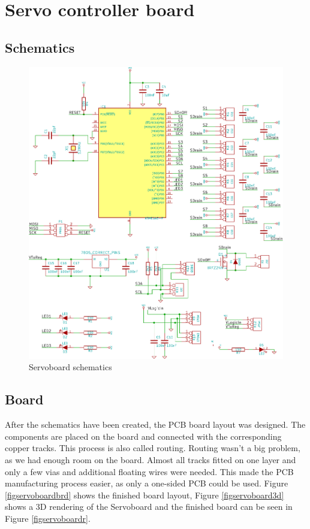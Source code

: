 \documentclass[a4paper
               ,10pt
               ,DIV=10 %
               ,BCOR=0.3cm
               ,pagesize %
               ,headings=small
               ,bibtotoc
               ]
               {scrartcl}
\begin{document}
\section{Servo controller board}

\subsection{Schematics}

\begin{figure}[H]
\begin{center}
\includegraphics[width=\linewidth]{pic/servoboard}
\caption{Servoboard schematics}
\label{figservoboardscm}
\end{center}
\end{figure}

\subsection{Board}
After the schematics have been created, the PCB board layout was designed.
The components are placed on the board and connected with the corresponding copper tracks.
This process is also called routing.
Routing wasn't a big problem, as we had enough room on the board.
Almost all tracks fitted on one layer and only a few vias and additional floating wires were needed.
This made the PCB manufacturing process easier, as only a one-sided PCB could be used.
Figure \ref{figservoboardbrd} shows the finished board layout, Figure \ref{figservoboard3d} shows a 3D rendering of the Servoboard and the finished board can be seen in Figure \ref{figservoboardr}.
\end{document}
